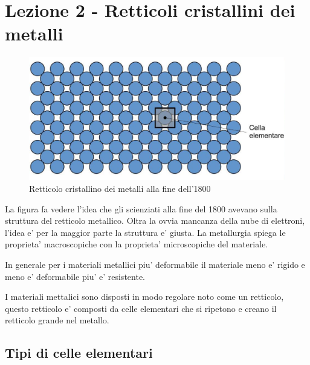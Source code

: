 \documentclass{article}
\begin{document}
    \section{Lezione 2 - Retticoli cristallini dei metalli}
        \begin{figure}[h!]
            \centering
            \includegraphics[width=\linewidth]{Retticolo pre 1800.png}
            \caption{Retticolo cristallino dei metalli alla fine dell'1800}
        \end{figure}
        La figura fa vedere l'idea che gli scienziati alla fine del 1800 avevano sulla struttura del retticolo metallico.
        Oltra la ovvia mancanza della nube di elettroni, l'idea e' per la maggior parte la struttura e' giusta.
        \newline \newline La metallurgia spiega le proprieta' macroscopiche con la proprieta' microscopiche del materiale.

        In generale per i materiali metallici piu' deformabile il materiale meno e' rigido e meno e' deformabile piu' e' resistente.

        I materiali mettalici sono disposti in modo regolare noto come un retticolo, questo retticolo e'
         composti da celle elementari che si ripetono e creano il retticolo grande nel metallo.

        \newpage
        \subsection{Tipi di celle elementari}
\end{document}
